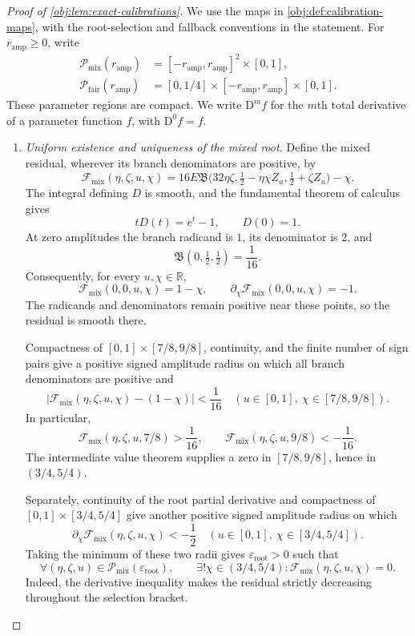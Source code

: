 \documentclass[11pt]{article}
\begin{document}
\begin{proof}[Proof of \cref{obj:lem:exact-calibrations}]
We use the maps in \cref{obj:def:calibration-maps}, with the root-selection and fallback conventions in the statement. For \(r_{\mathrm{amp}}\ge0\), write
\[
\begin{aligned}
\mathcal P_{\mathrm{mix}}(r_{\mathrm{amp}})
&=[-r_{\mathrm{amp}},r_{\mathrm{amp}}]^2\times[0,1],\\
\mathcal P_{\mathrm{fair}}(r_{\mathrm{amp}})
&=[0,1/4]\times[-r_{\mathrm{amp}},r_{\mathrm{amp}}]\times[0,1].
\end{aligned}
\]
These parameter regions are compact. We write \(\mathrm D^m f\) for the \(m\)th total derivative of a parameter function \(f\), with \(\mathrm D^0f=f\).

\begin{enumerate}
\item \emph{Uniform existence and uniqueness of the mixed root.}
Define the mixed residual, wherever its branch denominators are positive, by
\[
\mathcal F_{\mathrm{mix}}(\eta,\zeta,u,\chi)
=
16E\mathfrak B
\bigl(32\eta\zeta,\tfrac12-\eta\chi Z_u,
                    \tfrac12+\zeta Z_u\bigr)-\chi .
\]
The integral defining \(D\) is smooth, and the fundamental theorem of calculus gives
\[
tD(t)=e^t-1,\qquad D(0)=1.
\]
At zero amplitudes the branch radicand is \(1\), its denominator is \(2\), and
\[
\mathfrak B(0,\tfrac12,\tfrac12)=\frac1{16}.
\]
Consequently, for every \(u,\chi\in\mathbb R\),
\[
\mathcal F_{\mathrm{mix}}(0,0,u,\chi)=1-\chi,
\qquad
\partial_\chi\mathcal F_{\mathrm{mix}}(0,0,u,\chi)=-1.
\]
The radicands and denominators remain positive near these points, so the residual is smooth there.

Compactness of \([0,1]\times[7/8,9/8]\), continuity, and the finite number of sign pairs give a positive signed amplitude radius on which all branch denominators are positive and
\[
\left|
\mathcal F_{\mathrm{mix}}(\eta,\zeta,u,\chi)-(1-\chi)
\right|<\frac1{16}
\quad
\left(u\in[0,1],\ \chi\in[7/8,9/8]\right).
\]
In particular,
\[
\mathcal F_{\mathrm{mix}}(\eta,\zeta,u,7/8)>\frac1{16},
\qquad
\mathcal F_{\mathrm{mix}}(\eta,\zeta,u,9/8)<-\frac1{16}.
\]
The intermediate value theorem supplies a zero in \([7/8,9/8]\), hence in \((3/4,5/4)\).

Separately, continuity of the root partial derivative and compactness of
\([0,1]\times[3/4,5/4]\) give another positive signed amplitude radius on which
\[
\partial_\chi\mathcal F_{\mathrm{mix}}(\eta,\zeta,u,\chi)<-\frac12
\quad
\left(u\in[0,1],\ \chi\in[3/4,5/4]\right).
\]
Taking the minimum of these two radii gives
\(\varepsilon_{\mathrm{root}}>0\) such that
\[
\forall(\eta,\zeta,u)\in
\mathcal P_{\mathrm{mix}}(\varepsilon_{\mathrm{root}}),
\qquad
\exists!\chi\in(3/4,5/4):
\mathcal F_{\mathrm{mix}}(\eta,\zeta,u,\chi)=0.
\]
Indeed, the derivative inequality makes the residual strictly decreasing throughout the selection bracket.


\end{enumerate}
\end{proof}
\end{document}
